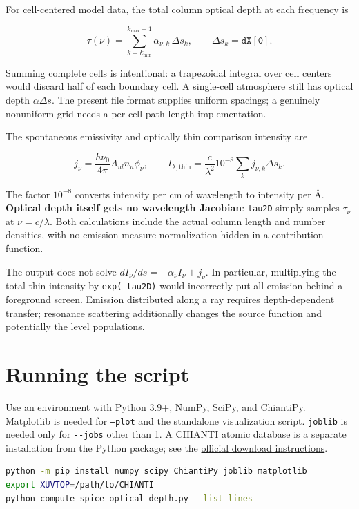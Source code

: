 \documentclass[
]{article}
\newcommand{\passthrough}[1]{#1}
\begin{document}
For cell-centered model data, the total column optical depth at each
frequency is

\[
\boxed{\tau(\nu)=\sum_{k=k_{\min}}^{k_{\max}-1}\alpha_{\nu,k}\,\Delta s_k},
\qquad \Delta s_k=\mathtt{dX[0]}.
\]

Summing complete cells is intentional: a trapezoidal integral over cell
centers would discard half of each boundary cell. A single-cell
atmosphere still has optical depth \(\alpha\Delta s\). The present file
format supplies uniform spacings; a genuinely nonuniform grid needs a
per-cell path-length implementation.

The spontaneous emissivity and optically thin comparison intensity are

\[
j_\nu=\frac{h\nu_0}{4\pi}A_{ul}n_u\phi_\nu,\qquad
I_{\lambda,\mathrm{thin}}=\frac{c}{\lambda^2}10^{-8}
\sum_k j_{\nu,k}\Delta s_k.
\]

The factor \(10^{-8}\) converts intensity per cm of wavelength to
intensity per Å. \textbf{Optical depth itself gets no wavelength
Jacobian}: \passthrough{\lstinline!tau2D!} simply samples \(\tau_\nu\)
at \(\nu=c/\lambda\). Both calculations include the actual column length
and number densities, with no emission-measure normalization hidden in a
contribution function.

The output does not solve \(dI_\nu/ds=-\alpha_\nu I_\nu+j_\nu\). In
particular, multiplying the total thin intensity by
\passthrough{\lstinline!exp(-tau2D)!} would incorrectly put all emission
behind a foreground screen. Emission distributed along a ray requires
depth-dependent transfer; resonance scattering additionally changes the
source function and potentially the level populations.

\section{Running the script}\label{running-the-script}

Use an environment with Python 3.9+, NumPy, SciPy, and ChiantiPy.
Matplotlib is needed for \texttt{--plot} and the standalone visualization script.
\passthrough{\lstinline!joblib!} is needed only for
\passthrough{\lstinline!--jobs!} other than 1. A CHIANTI atomic database
is a separate installation from the Python package; see the
\href{https://www.chiantidatabase.org/chianti_download.html}{official
download instructions}.

\begin{lstlisting}[language=bash]
python -m pip install numpy scipy ChiantiPy joblib matplotlib
export XUVTOP=/path/to/CHIANTI
python compute_spice_optical_depth.py --list-lines
\end{lstlisting}
\end{document}
